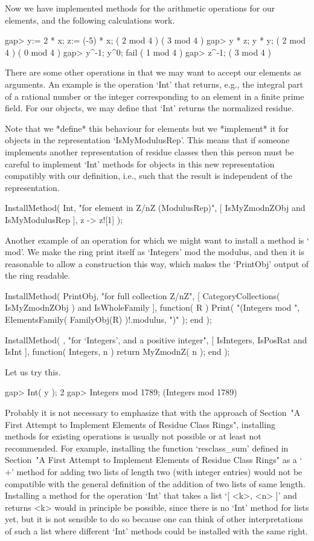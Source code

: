 Now we have implemented methods for the arithmetic operations for our
elements, and the following calculations work.

\begintt
gap> y:= 2 * x;  z:= (-5) * x;
( 2 mod 4 )
( 3 mod 4 )
gap> y * z;  y * y;
( 2 mod 4 )
( 0 mod 4 )
gap> y^-1;  y^0;
fail
( 1 mod 4 )
gap> z^-1;
( 3 mod 4 )
\endtt

There are some other operations in {\GAP} that we may want to accept
our elements as arguments.
An example is the operation `Int' that returns, e.g.,
the integral part of a rational number or the integer corresponding to
an element in a finite prime field.
For our objects, we may define that `Int' returns the normalized residue.

Note that we *define* this behaviour for elements
but we *implement* it for objects in the representation `IsMyModulusRep'.
This means that if someone implements another representation of
residue classes then this person must be careful to implement `Int'
methods for objects in this new representation compatibly with our
definition, i.e., such that the result is independent of the representation.

\begintt
InstallMethod( Int,
    "for element in Z/nZ (ModulusRep)",
    [ IsMyZmodnZObj and IsMyModulusRep ],
    z -> z![1] );
\endtt

Another example of an operation for which we might want to install
a method is `\\mod'.
We make the ring print itself as `Integers' mod the modulus,
and then it is reasonable to allow a construction this way,
which makes the `PrintObj' output of the ring {\GAP} readable.

\begintt
InstallMethod( PrintObj,
    "for full collection Z/nZ",
    [ CategoryCollections( IsMyZmodnZObj ) and IsWholeFamily ],
    function( R )
    Print( "(Integers mod ",
           ElementsFamily( FamilyObj(R) )!.modulus, ")" );
    end );

InstallMethod( \mod,
    "for `Integers', and a positive integer",
    [ IsIntegers, IsPosRat and IsInt ],
    function( Integers, n ) return MyZmodnZ( n ); end );
\endtt

Let us try this.

\begintt
gap> Int( y );
2
gap> Integers mod 1789;
(Integers mod 1789)
\endtt

Probably it is not necessary to emphasize that with the approach of
Section~"A First Attempt to Implement Elements of Residue Class Rings",
installing methods for existing operations is usually not possible or
at least not recommended.
For example, installing the function `resclass_sum' defined in
Section~"A First Attempt to Implement Elements of Residue Class Rings"
as a `\\+' method for adding two lists of length two
(with integer entries) would not be compatible with the general
definition of the addition of two lists of same length.
Installing a method for the operation `Int' that takes a list
`[ <k>, <n> ]' and returns <k> would in principle be possible,
since there is no `Int' method for lists yet,
but it is not sensible to do so because one can think of other
interpretations of such a list where different `Int' methods could
be installed with the same right.

